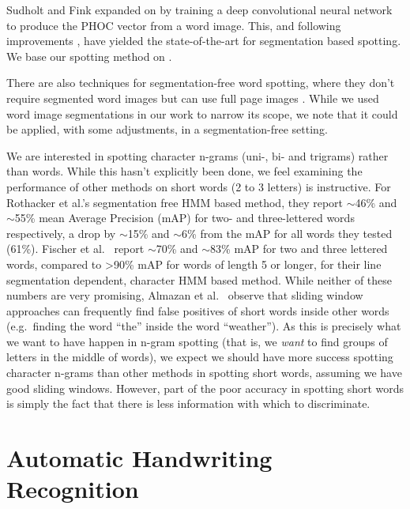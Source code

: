 \documentclass[ms,electronic,twosidetoc,letterpaper,chaptercenter,parttop,lol,lof,lot]{byumsphd}
\begin{document}
Sudholt and Fink \cite{sudholt2016,sudholt2017} expanded on \cite{Almazan2014} by training a deep convolutional neural network to produce the PHOC vector from a word image. This, and following improvements \cite{krishnan2016, retsinasTrans2017}, have yielded the state-of-the-art for segmentation based spotting. We base our spotting method on \cite{sudholt2017}.

There are also techniques for segmentation-free word spotting, where they don't require segmented word images but can use full page images \cite{wilkinson2017}. While we used word image segmentations in our work to narrow its scope, we note that it could be applied, with some adjustments, in a segmentation-free setting.

We are interested in spotting character n-grams (uni-, bi- and trigrams) rather than words. While this hasn't explicitly been done, we feel examining the performance of other methods on short words (2 to 3 letters) is instructive. For Rothacker et al.'s \cite{Rothacker2013} segmentation free HMM based method, they report $\sim$46\% and $\sim$55\% mean Average Precision (mAP) for two- and three-lettered words respectively, a drop by $\sim$15\% and $\sim$6\% from the mAP for all words they tested (61\%). Fischer et al.~\cite{Fischer2012} report $\sim$70\% and $\sim$83\% mAP for two and three lettered words, compared to {\textgreater}90\% mAP for words of length 5 or longer, for their line segmentation dependent, character HMM based method. While neither of these numbers are very promising, Almazan et al.~\cite{Almazan2012} observe that sliding window approaches can frequently find false positives of short words inside other words (e.g.~finding the word ``the'' inside the word ``weather''). As this is precisely what we want to have happen in n-gram spotting (that is, we \textit{want} to find groups of letters in the middle of words), we expect we should have more success spotting character n-grams than other methods in spotting short words, assuming we have good sliding windows. However, part of the poor accuracy in spotting short words is simply the fact that there is less information with which to discriminate.%


\section{Automatic Handwriting Recognition}
\end{document}
